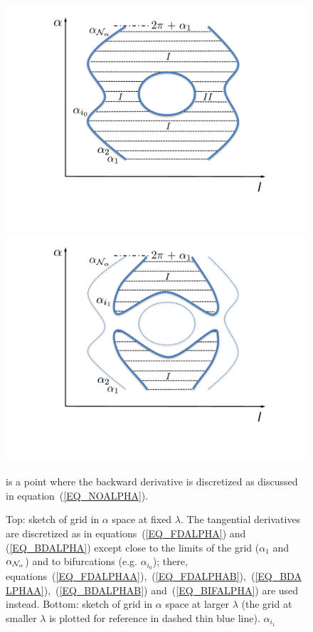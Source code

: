 \begin{figure}
\centering
\includegraphics[angle=0,width=0.8\columnwidth]{figures/alpha_l}\vskip-1.5cm
\includegraphics[angle=0,width=0.8\columnwidth]{figures/alpha_l_largelambda}\vskip-0.5cm
\caption{Top: sketch of grid in $\alpha$ space at fixed $\lambda$. The tangential derivatives are discretized as in equations~(\ref{EQ_FDALPHA}) and (\ref{EQ_BDALPHA}) except close to the limits of the grid ($\alpha_1$ and $\alpha_{{\cal{N}}_\alpha}$) and to bifurcations (e.g. $\alpha_{i_0}$); there, equations~(\ref{EQ_FDALPHAA}),~(\ref{EQ_FDALPHAB}),~(\ref{EQ_BDALPHAA}),~(\ref{EQ_BDALPHAB})  and~(\ref{EQ_BIFALPHA}) are used instead. Bottom:  sketch of grid in $\alpha$ space at larger $\lambda$ (the grid at smaller $\lambda$ is plotted for reference in dashed thin blue line). $\alpha_{i_1}$} is a point where the backward derivative is discretized as discussed in equation~(\ref{EQ_NOALPHA}).
\label{FIG_ALPHA}
\end{figure}

